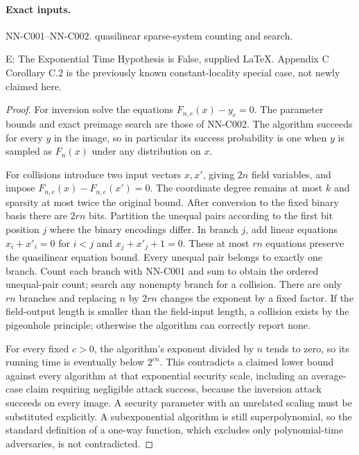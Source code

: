 \paragraph{Exact inputs.}
NN-C001--NN-C002. quasilinear sparse-system counting and search.

E: The Exponential Time Hypothesis is False, supplied LaTeX. Appendix C Corollary C.2 is the previously known constant-locality special case, not newly claimed here.

\begin{proof}
For inversion solve the equations $F_{n,e}(x)-y_e=0$. The parameter bounds and exact preimage search are those of NN-C002. The algorithm succeeds for every $y$ in the image, so in particular its success probability is one when $y$ is sampled as $F_n(x)$ under any distribution on $x$.

For collisions introduce two input vectors $x,x'$, giving $2n$ field variables, and impose $F_{n,e}(x)-F_{n,e}(x')=0$. The coordinate degree remains at most $k$ and sparsity at most twice the original bound. After conversion to the fixed binary basis there are $2rn$ bits. Partition the unequal pairs according to the first bit position $j$ where the binary encodings differ. In branch $j$, add linear equations $x_i+x'_i=0$ for $i<j$ and $x_j+x'_j+1=0$. These at most $rn$ equations preserve the quasilinear equation bound. Every unequal pair belongs to exactly one branch. Count each branch with NN-C001 and sum to obtain the ordered unequal-pair count; search any nonempty branch for a collision. There are only $rn$ branches and replacing $n$ by $2rn$ changes the exponent by a fixed factor. If the field-output length is smaller than the field-input length, a collision exists by the pigeonhole principle; otherwise the algorithm can correctly report none.

For every fixed $c>0$, the algorithm's exponent divided by $n$ tends to zero, so its running time is eventually below $2^{cn}$. This contradicts a claimed lower bound against every algorithm at that exponential security scale, including an average-case claim requiring negligible attack success, because the inversion attack succeeds on every image. A security parameter with an unrelated scaling must be substituted explicitly. A subexponential algorithm is still superpolynomial, so the standard definition of a one-way function, which excludes only polynomial-time adversaries, is not contradicted.
\end{proof}
